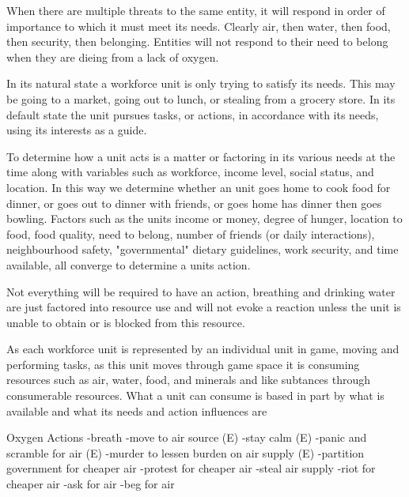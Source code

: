 When there are multiple threats to the same entity, it will respond in order of importance to which it must meet its needs. Clearly air, then water, then food, then security, then belonging. Entities will not respond to their need to belong when they are dieing from a lack of oxygen.

In its natural state a workforce unit is only trying to satisfy its needs. This may be going to a market, going out to lunch, or stealing from a grocery store. In its default state the unit pursues tasks, or actions, in accordance with its needs, using its interests as a guide.

To determine how a unit acts is a matter or factoring in its various needs at the time along with variables such as workforce, income level, social status, and location. In this way we determine whether an unit goes home to cook food for dinner, or goes out to dinner with friends, or goes home has dinner then goes bowling. Factors such as the units income or money, degree of hunger, location to food, food quality, need to belong, number of friends (or daily interactions), neighbourhood safety, "governmental" dietary guidelines, work security, and time available, all converge to determine a units action. 

Not everything will be required to have an action, breathing and drinking water are just factored into resource use and will not evoke a reaction unless the unit is unable to obtain or is blocked from this resource.

As each workforce unit is represented by an individual unit in game, moving and performing tasks, as this unit moves through game space it is consuming resources such as air, water, food, and minerals and like subtances through consumerable resources. What a unit can consume is based in part by what is available and what its needs and action influences are


Oxygen Actions
-breath 
-move to air source (E)
-stay calm (E)
-panic and scramble for air (E)
-murder to lessen burden on air supply (E)
-partition government for cheaper air
-protest for cheaper air
-steal air supply
-riot for cheaper air
-ask for air
-beg for air

